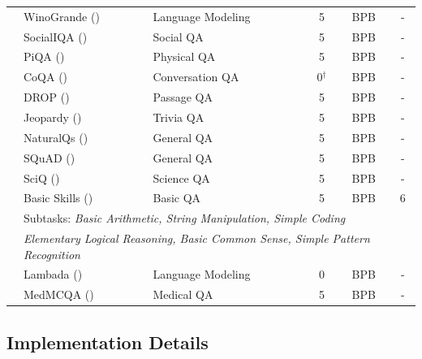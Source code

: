 \documentclass[table]{ai2style/ai2}
\begin{document}
\begin{table}[t]
\begin{scriptsize}
\begin{tabular}{lllccc}
\rowcolor{ai2offwhite} & WinoGrande (\citeyear{Sakaguchi_Le_Bras_Bhagavatula_Choi_2020}) & Language Modeling & 5 & BPB & - \\
\rowcolor{ai2offwhite} & SocialIQA (\citeyear{sap-etal-2019-social}) & Social QA & 5 & BPB & - \\
\rowcolor{ai2offwhite} & PiQA (\citeyear{Bisk_Zellers_Le_bras_Gao_Choi_2020}) & Physical QA & 5 & BPB & - \\
\rowcolor{ai2offwhite} & CoQA (\citeyear{reddy-etal-2019-coqa}) & Conversation QA & 0$^\dagger$ & BPB & - \\
\rowcolor{ai2offwhite} & DROP (\citeyear{dua-etal-2019-drop}) & Passage QA & 5 & BPB & - \\
\rowcolor{ai2offwhite} & Jeopardy (\citeyear{mosaic-jeopardy}) & Trivia QA & 5 & BPB & - \\
\rowcolor{ai2offwhite} & NaturalQs (\citeyear{kwiatkowski-etal-2019-natural}) & General QA & 5 & BPB & - \\
\rowcolor{ai2offwhite} & SQuAD (\citeyear{rajpurkar-etal-2016-squad}) & General QA & 5 & BPB & - \\
\rowcolor{ai2offwhite} & SciQ (\citeyear{welbl-etal-2017-crowdsourcing}) & Science QA & 5 & BPB & - \\
\rowcolor{ai2offwhite} & Basic Skills (\citeyear{olmo2025olmo3}) & Basic QA & 5 & BPB & 6 \\
\rowcolor{ai2offwhite} & \multicolumn{5}{l}{\hspace{6pt}Subtasks: \textit{Basic Arithmetic, String Manipulation, Simple Coding} } \\
\rowcolor{ai2offwhite} & \multicolumn{5}{l}{\hspace{6pt}\textit{Elementary Logical Reasoning, Basic Common Sense, Simple Pattern Recognition} } \\
\rowcolor{ai2offwhite} & Lambada (\citeyear{paperno2016lambada}) & Language Modeling & 0 & BPB & - \\
\rowcolor{ai2offwhite} \multirow{-23}{*}{\rotatebox[origin=c]{90}{\textit{QA}}} & MedMCQA (\citeyear{pmlr-v174-pal22a}) & Medical QA & 5 & BPB & - \\
\bottomrule
\end{tabular}
\end{scriptsize}
  \vspace{6pt}
  \label{tab:eval_suite}
\end{table}

\subsection{Implementation Details}\label{supp:imp_details}
\end{document}
